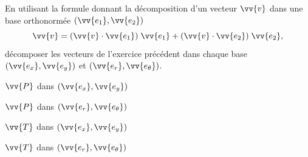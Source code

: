 En utilisant la formule donnant la décomposition d'un vecteur $\vv{v}$ dans une base orthonormée $(\vv{e_1},\vv{e_2})$
\[
\vv{v} = (\vv{v}\cdot\vv{e_1})\;\vv{e_1} +
					(\vv{v}\cdot\vv{e_2})\;\vv{e_2},
					\]
décomposer les vecteurs de l'exercice précédent dans chaque base $(\vv{e_x},\vv{e_y})$ et $(\vv{e_r},\vv{e_\theta})$.\label{decompositions}

\debutEntrainement


\begin{enonce}
$\vv{P}$ dans $(\vv{e_x}, \vv{e_y})$
\end{enonce}




\begin{enonce}
$\vv{P}$ dans $(\vv{e_r}, \vv{e_\theta})$
\end{enonce}




\begin{enonce}
$\vv{T}$ dans $(\vv{e_x}, \vv{e_y})$
\end{enonce}




\begin{enonce}
$\vv{T}$ dans $(\vv{e_r}, \vv{e_\theta})$
\end{enonce}



